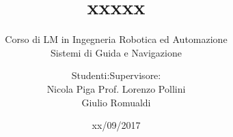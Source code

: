 \documentclass{beamer}
\date{xx/09/2017}
\title[]{xxxxx}
\subtitle{Corso di LM in Ingegneria Robotica ed Automazione \\
  Sistemi di Guida e Navigazione}
\author{Studenti:\hfill Supervisore:\\
Nicola Piga \hfill Prof. Lorenzo Pollini\\
Giulio Romualdi}
\institute[]{Università di Pisa}
\begin{document}

\begin{frame}
  \maketitle
\end{frame}













\end{document}
